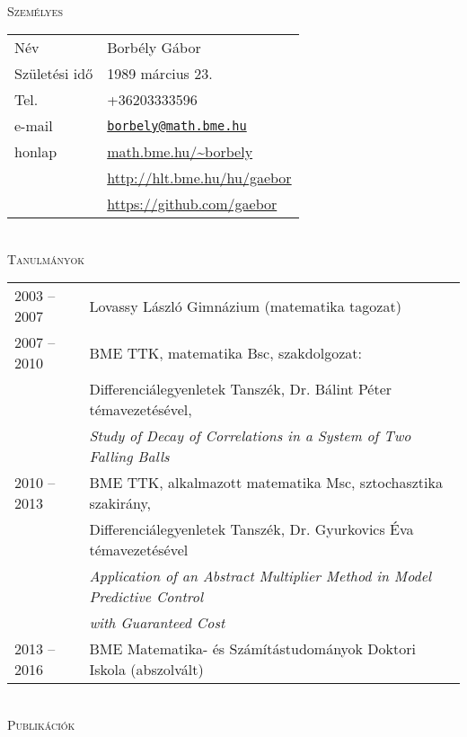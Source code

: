 \documentclass[12pt]{article}
\newcommand\mail[1]{\href{mailto:#1}{\texttt{#1}}}
\begin{document}
{ \ }
\\
\textsc{Személyes}
 \vspace{0.3cm}
 \\
       \begin{tabular}{p{3cm}l}
	       Név & Borbély Gábor \\
           Születési idő & 1989 március 23.\\
		   Tel. &  +36203333596\\
		   e-mail & \mail{borbely@math.bme.hu}\\
		   honlap & \url{math.bme.hu/~borbely} \\
                  & \url{http://hlt.bme.hu/hu/gaebor} \\
                  & \url{https://github.com/gaebor}
       \end{tabular}
 \vspace{0.3cm}
 \\
 \textsc{Tanulmányok}
 \vspace{0.3cm}
 \\
       \begin{tabular}{p{3cm}l}
	       2003 -- 2007 & Lovassy László Gimnázium (matematika tagozat) \\
           2007 -- 2010& BME TTK, matematika Bsc, szakdolgozat: \\
		              & Differenciálegyenletek Tanszék, Dr. Bálint Péter témavezetésével, \\
					  & \emph{Study of Decay of Correlations in a System of Two Falling Balls} \\
		   2010 -- 2013 & BME TTK, alkalmazott matematika Msc, sztochasztika szakirány,\\
						& Differenciálegyenletek Tanszék, Dr. Gyurkovics Éva témavezetésével \\
						& \emph{Application of an Abstract Multiplier Method in Model Predictive Control}\\ & \emph{ with Guaranteed Cost} \\
		   2013 -- 2016 & BME Matematika- és Számítástudományok Doktori Iskola (abszolvált)
       \end{tabular}
 \vspace{0.3cm}
 \\
 \textsc{Publikációk}
 \vspace{0.3cm}
 \\
\end{document}
